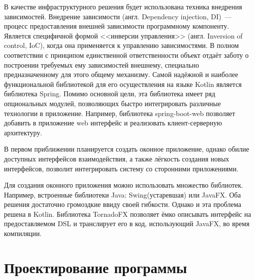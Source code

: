 В качестве инфраструктурного решения будет использована техника внедрения зависимостей.
Внедрение зависимости (англ. Dependency injection, DI)~--- процесс предоставления внешней зависимости программному компоненту. 
Является специфичной формой <<инверсии управления>> (англ. Inversion of control, IoC), когда она применяется к управлению зависимостями. 
В полном соответствии с принципом единственной ответственности объект отдаёт заботу о построении требуемых ему зависимостей внешнему, специально предназначенному для этого общему механизму.
Самой надёжной и наиболее функциональной библиотекой для его осуществления на языке Kotlin является библиотека Spring.\cite{reddy2017spring}
Помимо основной цели, эта библиотека имеет ряд опциональных модулей, позволяющих быстро интегрировать различные технологии в приложение. 
Например, библиотека spring-boot-web позволяет добавить в приложение web интерфейс и реализовать клиент-серверную архитектуру.

В первом приближении планируется создать оконное приложение, однако обилие доступных интерфейсов взаимодействия, а также лёгкость создания новых интерфейсов, позволит интегрировать систему со сторонними приложениями.

Для создания оконного приложения можно использовать множество библиотек. 
Например, встроенные библиотеки Java: Swing(устаревшая) или JavaFX.
Оба решения достаточно громоздкие ввиду своей гибкости.
Однако и эта проблема решена в Kotlin. 
Библиотека TornadoFX \cite{dea2017appendix}  позволяет ёмко описывать интерфейс на предоставляемом DSL и транслирует его в код, использующий JavaFX, во время компиляции.

\chapter{Проектирование программы}

